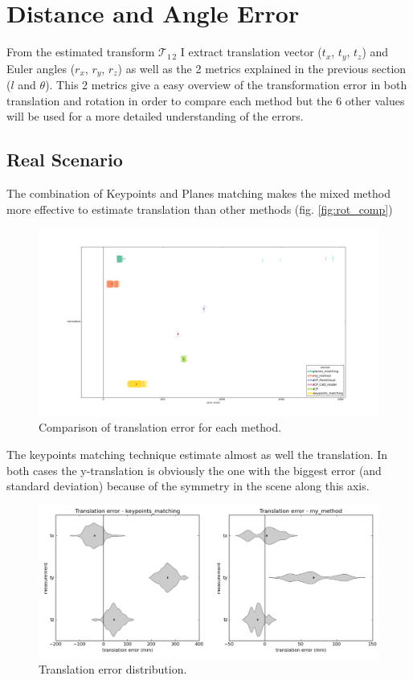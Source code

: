 \section{Distance and Angle Error}

From the estimated transform $\mathcal{T}_{1\,2}$ I extract translation vector ($t_x$, $t_y$, $t_z$) and Euler angles ($r_x$, $r_y$, $r_z$) as well as the 2 metrics explained in the previous section ($l$ and $\theta$). This 2 metrics give a easy overview of the transformation error in both translation and rotation in order to compare each method but the 6 other values will be used for a more detailed understanding of the errors.

\subsection{Real Scenario}

The combination of Keypoints and Planes matching makes the mixed method more effective to estimate translation than other methods (fig. \ref{fig:rot_comp})

\begin{figure}[h!]
    \centering
    \includegraphics[width=\textwidth]{images/transl_comp.png}
    \caption{Comparison of translation error for each method.}
    \label{fig:trans_comp}
\end{figure}

The keypoints matching technique estimate almost as well the translation. In both cases the y-translation is obviously the one with the biggest error (and standard deviation) because of the symmetry in the scene along this axis.

\begin{figure}[h!]
    \centering
    \includegraphics[width=\textwidth]{images/transl_violin.png}
    \caption{Translation error distribution.}
    \label{fig:transl_violin}
\end{figure}

